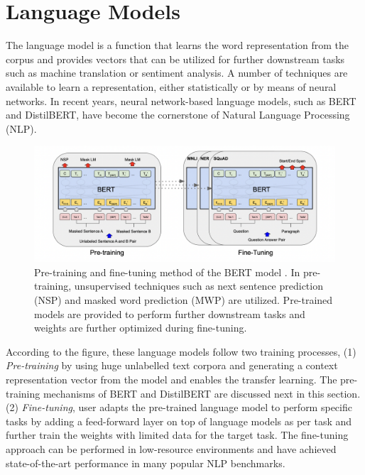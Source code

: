\documentclass[%
	BCOR=8mm, %
	DIV=12,
	toc=bibliography, %
	toc=listof, %
	oneside, %
	egregdoesnotlikesansseriftitles, %
	]{scrbook}
\begin{document}
\section{Language Models}
\label{section:langaugemodels}
The language model is a function that learns the word representation from the corpus and provides vectors that can be utilized for further downstream tasks such as machine translation or sentiment analysis. A number of techniques are available to learn a representation, either statistically or by means of neural networks. In recent years, neural network-based language models, such as BERT and DistilBERT, have become the cornerstone of Natural Language Processing (NLP). 
\begin{figure}[H]
    \centering
    \includegraphics[width=0.8\linewidth]{img/pre_fintune.png}
    \caption[Diagram of pre-training and fine-tuning of BERT model]{ \small Pre-training and fine-tuning method of the BERT model \cite{devlin_bert_2019-1}. In pre-training, unsupervised techniques such as next sentence prediction (NSP) and masked word prediction (MWP) are utilized. Pre-trained models are provided to perform further downstream tasks and weights are further optimized during fine-tuning.}
    \label{fig:prefintune}
\end{figure}
According to the figure, these language models follow two training processes, (1)\textit{ Pre-training} by using huge unlabelled text corpora and generating a context representation vector from the model \cite{devlin_bert_2019-1}  and enables the transfer learning. The pre-training mechanisms of BERT and DistilBERT are discussed next in this section. (2) \textit{Fine-tuning}, user adapts the pre-trained language model to perform specific tasks by adding a feed-forward layer on top of language models as per task and further train the weights with limited data for the target task. The fine-tuning approach can be performed in low-resource environments and have achieved state-of-the-art performance in many popular NLP benchmarks.
\end{document}

